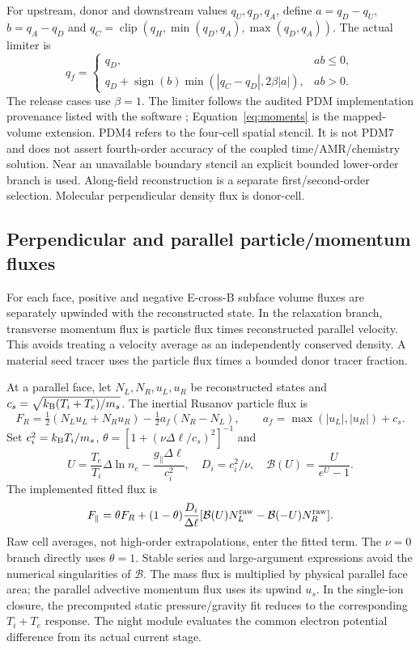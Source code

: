 For upstream, donor and downstream values $q_U,q_D,q_A$, define
$a=q_D-q_U$, $b=q_A-q_D$ and
$q_C=\operatorname{clip}(q_H,\min(q_D,q_A),\max(q_D,q_A))$.
The actual limiter is
\begin{equation}
 q_f=\begin{cases}
 q_D,&ab\le0,\\
 q_D+\operatorname{sign}(b)
 \min(|q_C-q_D|,2\beta|a|),&ab>0.
 \end{cases}\label{eq:pdm}
\end{equation}
The release cases use $\beta=1$. The limiter follows the audited PDM
implementation provenance listed with the software \citep{PDMSource};
Equation~\eqref{eq:moments} is the mapped-volume extension. PDM4 refers to
the four-cell spatial stencil. It is not PDM7 and does not assert fourth-order
accuracy of the coupled time/AMR/chemistry solution. Near an unavailable
boundary stencil an explicit bounded lower-order branch is used. Along-field
reconstruction is a separate first/second-order selection. Molecular
perpendicular density flux is donor-cell.

\subsection{Perpendicular and parallel particle/momentum fluxes}
For each face, positive and negative E-cross-B subface volume fluxes are
separately upwinded with the reconstructed state. In the relaxation branch,
transverse momentum flux is particle flux times reconstructed parallel
velocity. This avoids treating a velocity average as an independently
conserved density. A material seed tracer uses the particle flux times a
bounded donor tracer fraction.

At a parallel face, let $N_L,N_R,u_L,u_R$ be reconstructed states and
$c_s=\sqrt{k_{\rm B}(T_i+T_e)/m_s}$. The inertial Rusanov particle flux is
\begin{equation}
 F_R=\tfrac12(N_Lu_L+N_Ru_R)
 -\tfrac12 a_f(N_R-N_L),\qquad a_f=\max(|u_L|,|u_R|)+c_s.
\end{equation}
Set $c_i^2=k_{\rm B} T_i/m_s$, $\theta=[1+(\nu\Delta\ell/c_s)^2]^{-1}$ and
\begin{equation}
 U=\frac{T_e}{T_i}\Delta\ln n_e-\frac{g_\parallel\Delta\ell}{c_i^2},
 \quad D_i=c_i^2/\nu,\quad \mathcal B(U)=\frac{U}{e^U-1}.
\end{equation}
The implemented fitted flux is
\begin{equation}
 F_\parallel=\theta F_R+
 (1-\theta)\frac{D_i}{\Delta\ell}
 [\mathcal B(U)N_L^{\rm raw}-\mathcal B(-U)N_R^{\rm raw}].
 \label{eq:SG}
\end{equation}
Raw cell averages, not high-order extrapolations, enter the fitted term.
The $\nu=0$ branch directly uses $\theta=1$. Stable series and
large-argument expressions avoid the numerical singularities of
$\mathcal B$. The mass flux is multiplied by physical parallel face area;
the parallel advective momentum flux uses its upwind $u_s$. In the
single-ion closure, the precomputed static pressure/gravity fit reduces to
the corresponding $T_i+T_e$ response. The night module evaluates the common
electron potential difference from its actual current stage.

